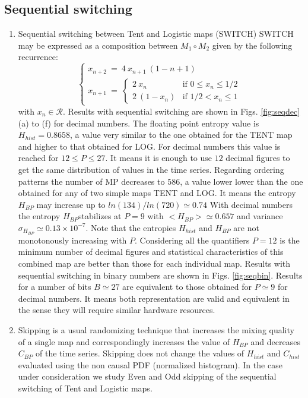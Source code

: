 \subsection{Sequential switching}
\begin{enumerate}
\item Sequential switching between Tent and Logistic maps (SWITCH)
SWITCH may be expressed as a composition between $M_1 \circ M_2$ given by the following recurrence:
%
\[ \left\{ \begin{array}{ccc}\label{eq:seq}
x_{n+2}~=~ 4~x_{n+1}~(1-{n+1}) \\
x_{n+1}~=~ \left\{ \begin{array}{ll}
2~{x_n} & \textrm{if $0\leq x_n\leq 1/2$}\\
2~(1-{x_n}) & \textrm{if $1/2<x_n\leq 1$} 
\end{array} \right.  \end{array}\right. \] 
with $x_n\in\mathcal{R}$.
%
Results with sequential switching are shown in Figs. \ref{fig:seqdec} (a) to (f) for decimal numbers. The floating point entropy value is $H_{hist}=0.8658$, a value very similar to the one obtained for the TENT map and higher to that obtained for LOG. For decimal numbers this value is reached for $12 \leq P \leq 27$. It means it is enough to use $12$ decimal figures to get the same distribution of values in the time series. Regarding ordering patterns the number of MP decreases to $586$, a value lower lower than the one obtained for any of two simple maps TENT and LOG. It means the entropy $H_{BP}$ may increase up to $ln(134)/ln(720)\simeq 0.74$ With decimal numbers the entropy $H_{BP} $stabilizes at $P=9$ with $<H_{BP}>\simeq 0.657$ and variance $\sigma_{H_{BP}} \simeq 0.13 \times 10^{-7}$. Note that the entropies $H_{hist}$ and $H_{BP}$ are not monotonously increasing with $P$.  Considering all the quantifiers $P=12$ is the minimum number of decimal figures and statistical characteristics of this combined map are better than those for each individual map.
%
Results with sequential switching in binary numbers are shown in Figs. \ref{fig:seqbin}. Results for a number of bits $B\simeq27$ are equivalent to those obtained for $P\simeq 9$ for decimal numbers. It means both representation are valid and equivalent in the sense they will require similar hardware resources. 
\item 
Skipping is a usual randomizing technique that increases the mixing quality of a single map and correspondingly increases the value of $H_{BP}$ and decreases $C_{BP} $ of the time series. Skipping does not change the values of $H_{hist}$ and $C_{hist}$ evaluated using the non causal PDF (normalized histogram)\cite{DeMicco2008}. In the case under consideration we study Even and Odd skipping of the sequential switching of Tent and Logistic maps.

\end{enumerate}
